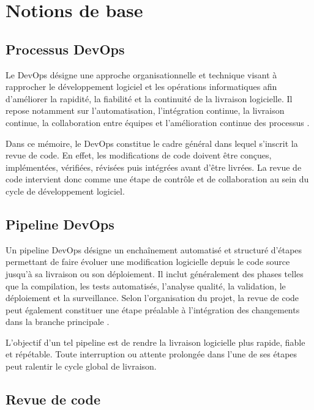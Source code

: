 
\section{Notions de base}

\subsection{Processus DevOps}

Le DevOps désigne une approche organisationnelle et technique visant à rapprocher le développement logiciel et les opérations informatiques afin d’améliorer la rapidité, la fiabilité et la continuité de la livraison logicielle. Il repose notamment sur l’automatisation, l’intégration continue, la livraison continue, la collaboration entre équipes et l’amélioration continue des processus \cite{bass2015devops,leite2020devops}.

Dans ce mémoire, le DevOps constitue le cadre général dans lequel s’inscrit la revue de code. En effet, les modifications de code doivent être conçues, implémentées, vérifiées, révisées puis intégrées avant d’être livrées. La revue de code intervient donc comme une étape de contrôle et de collaboration au sein du cycle de développement logiciel.



\subsection{Pipeline DevOps}

Un pipeline DevOps désigne un enchaînement automatisé et structuré d’étapes permettant de faire évoluer une modification logicielle depuis le code source jusqu’à sa livraison ou son déploiement. Il inclut généralement des phases telles que la compilation, les tests automatisés, l’analyse qualité, la validation, le déploiement et la surveillance. Selon l’organisation du projet, la revue de code peut également constituer une étape préalable à l’intégration des changements dans la branche principale \cite{humble2010continuous,shahin2017continuous}.

L’objectif d’un tel pipeline est de rendre la livraison logicielle plus rapide, fiable et répétable. Toute interruption ou attente prolongée dans l’une de ses étapes peut ralentir le cycle global de livraison.



\subsection{Revue de code}

